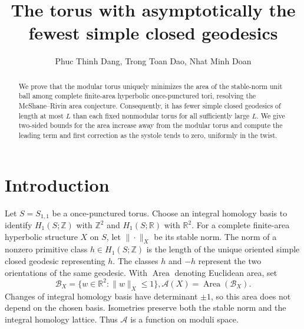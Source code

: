 \documentclass[10pt,twoside]{article}
\title{The torus with asymptotically the fewest
simple closed geodesics}
\author{Phuc Thinh Dang, Trong Toan Dao, Nhat Minh Doan}
\date{}
\theoremstyle{plain}
\theoremstyle{definition}
\theoremstyle{remark}
\DeclareMathOperator{\Area}{Area}
\newcommand{\A}{\mathcal A}
\newcommand{\B}{\mathcal B}
\newcommand{\R}{\mathbb R}
\newcommand{\Z}{\mathbb Z}
\begin{document}
\maketitle
\thispagestyle{plain}
\begingroup
\renewcommand{\thefootnote}{}
\begin{NoHyper}
\end{NoHyper}
\endgroup

\begin{abstract}
We prove that the modular torus uniquely minimizes the area of the
stable-norm unit ball among complete finite-area hyperbolic
once-punctured tori, resolving the McShane--Rivin area conjecture.
Consequently, it has fewer simple closed geodesics of length at most $L$
than each fixed nonmodular torus for all sufficiently large $L$.
We give two-sided bounds for the area increase away from the modular
torus and compute the leading term and first correction as the
systole tends to zero, uniformly in the twist.
\end{abstract}

\setcounter{tocdepth}{1}
\begingroup
\setlength{\parskip}{0pt}
\hypersetup{linkcolor=blue,linktoc=section}
\tableofcontents
\endgroup

\section{Introduction}

Let $S=S_{1,1}$ be a once-punctured torus. Choose an integral homology
basis to identify $H_1(S;\Z)$ with $\Z^2$ and $H_1(S;\R)$ with $\R^2$.
For a complete finite-area hyperbolic structure $X$ on $S$, let
$\|\cdot\|_X$ be its stable norm. The norm of a nonzero primitive
class $h\in H_1(S;\Z)$ is the length of the unique oriented simple
closed geodesic representing $h$. The classes $h$ and $-h$ represent
the two orientations of the same geodesic. With $\Area$ denoting
Euclidean area, set
$$
\B_X=\{w\in\R^2:\|w\|_X\leq1\},
\A(X)=\Area(\B_X).
$$
Changes of integral homology basis have determinant $\pm1$, so this
area does not depend on the chosen basis. Isometries preserve both
the stable norm and the integral homology lattice. Thus $\A$ is a
function on moduli space.
\end{document}
